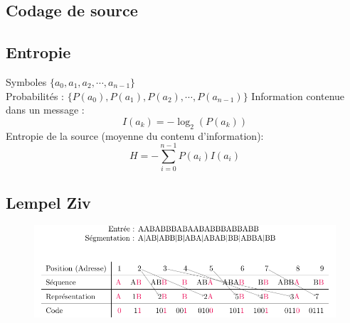 \documentclass[]{article}
\begin{document}
\begin{multicols}{3}
\section{Codage de source}
\subsection{Entropie}
Symboles $\lbrace a_0, a_1, a_2, \cdots, a_{n-1}\rbrace$\\
Probabilités : $\lbrace P(a_0), P(a_1), P(a_2), \cdots, P(a_{n-1})\rbrace$
Information contenue dans un message :
$$I(a_k)=-\log_2(P(a_k))$$
Entropie de la source (moyenne du contenu d'information):
$$H=-\sum_{i=0}^{n-1}P(a_i)I(a_i)$$



\subsection{Lempel Ziv}
\begin{figure}[H]
\centering
\includegraphics[width=\columnwidth]{drwg_0.pdf}
\end{figure}


\end{multicols}
\end{document}
